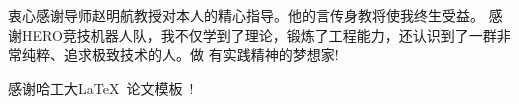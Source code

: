 \begin{acknowledgements}
衷心感谢导师赵明航教授对本人的精心指导。他的言传身教将使我终生受益。
感谢HERO竞技机器人队，我不仅学到了理论，锻炼了工程能力，还认识到了一群非常纯粹、追求极致技术的人。做
有实践精神的梦想家!

感谢哈工大\LaTeX\ 论文模板\hithesis\ !

\end{acknowledgements}

